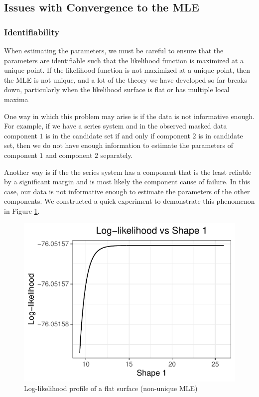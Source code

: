 \documentclass[
]{article}
\begin{document}
\hypertarget{sec:opt_rescale}{%
\subsection{Issues with Convergence to the MLE}\label{sec:opt_rescale}}

\hypertarget{identifiability}{%
\subsubsection*{Identifiability}\label{identifiability}}

When estimating the parameters, we must be careful to ensure that the
parameters are identifiable such that the likelihood function is
maximized at a unique point. If the likelihood function is not maximized
at a unique point, then the MLE is not unique, and a lot of the theory
we have developed so far breaks down, particularly when the likelihood
surface is flat or has multiple local maxima
\citep{mclachlan2007algorithm}

One way in which this problem may arise is if the data is not
informative enough. For example, if we have a series system and in the
observed masked data component \(1\) is in the candidate set if and only
if component \(2\) is in candidate set, then we do not have enough
information to estimate the parameters of component \(1\) and component
\(2\) separately.

Another way is if the the series system has a component that is the
least reliable by a significant margin and is most likely the component
cause of failure. In this case, our data is not informative enough to
estimate the parameters of the other components. We constructed a quick
experiment to demonstrate this phenomenon in Figure
\ref{fig:flat-loglike-prof}.

\begin{figure}

{\centering \includegraphics{image/last_plot} 

}

\caption{Log-likelihood profile of a flat surface (non-unique MLE)}\label{fig:flat-loglike-prof}
\end{figure}
\end{document}
